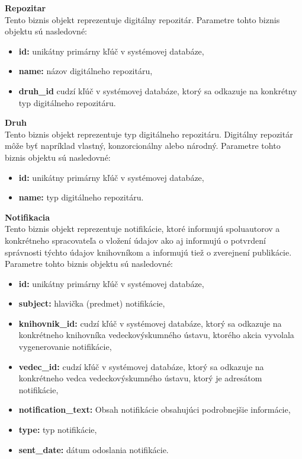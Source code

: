\documentclass[10pt,oneside,slovak,a4paper]{article}
\begin{document}
\textbf{Repozitar}\\
Tento biznis objekt reprezentuje digitálny repozitár. Parametre tohto biznis objektu sú nasledovné:

\begin{itemize}
\item \textbf{id:} unikátny primárny kľúč v systémovej databáze,
\item \textbf{name:} názov digitálneho repozitáru,
\item \textbf{druh\_id} cudzí kľúč v systémovej databáze, ktorý sa odkazuje na konkrétny typ digitálneho repozitáru.
\end{itemize}

\textbf{Druh}\\
Tento biznis objekt reprezentuje typ digitálneho repozitáru. Digitálny repozitár môže byť napríklad vlastný, konzorcionálny alebo národný. Parametre tohto biznis objektu sú nasledovné:

\begin{itemize}
\item \textbf{id:} unikátny primárny kľúč v systémovej databáze,
\item \textbf{name:} typ digitálneho repozitáru.
\end{itemize}

\textbf{Notifikacia}\\
Tento biznis objekt reprezentuje notifikácie, ktoré informujú spoluautorov a konkrétneho spracovateľa o vložení údajov ako aj informujú o potvrdení správnosti týchto údajov knihovníkom a informujú tiež o zverejnení publikácie. Parametre tohto biznis objektu sú nasledovné:

\begin{itemize}
\item \textbf{id:} unikátny primárny kľúč v systémovej databáze,
\item \textbf{subject:} hlavička (predmet) notifikácie,
\item \textbf{knihovnik\_id:} cudzí kľúč v systémovej databáze, ktorý sa odkazuje na konkrétneho knihovníka vedeckovýskumného ústavu, ktorého akcia vyvolala vygenerovanie notifikácie,
\item \textbf{vedec\_id:} cudzí kľúč v systémovej databáze, ktorý sa odkazuje na konkrétneho vedca vedeckovýskumného ústavu, ktorý je adresátom notifikácie,
\item \textbf{notification\_text:} Obsah notifikácie obsahujúci podrobnejšie informácie,
\item \textbf{type:} typ notifikácie,
\item \textbf{sent\_date:} dátum odoslania notifikácie.
\end{itemize}
\end{document}
